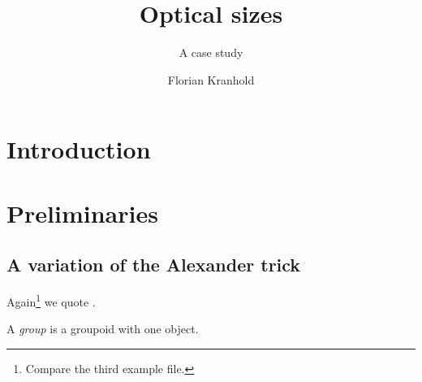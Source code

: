 \documentclass[british,paper=a5]{etsartcl}
\begin{document}
\author  {Florian Kranhold}
\title   {Optical sizes}
\subtitle{A case study}
\subject {University of \LaTeX}

\maketitle

\begin{abstract}\lipsum[2][2-6]\end{abstract}

\section{Introduction}
\lipsum[1-3]

\section{Preliminaries}
\lipsum[4-8]

\subsection{A variation of the Alexander trick}

\lipsum[2] Again\footnote{Compare the third example file.} we quote \cite{Bredon}.

\begin{defi}A \emph{group} is a groupoid with one object.\end{defi}

\begin{figure}
  \caption{\lipsum[1][1-3]}
\end{figure}

\lipsum[3]

\printbibliography
\end{document}
